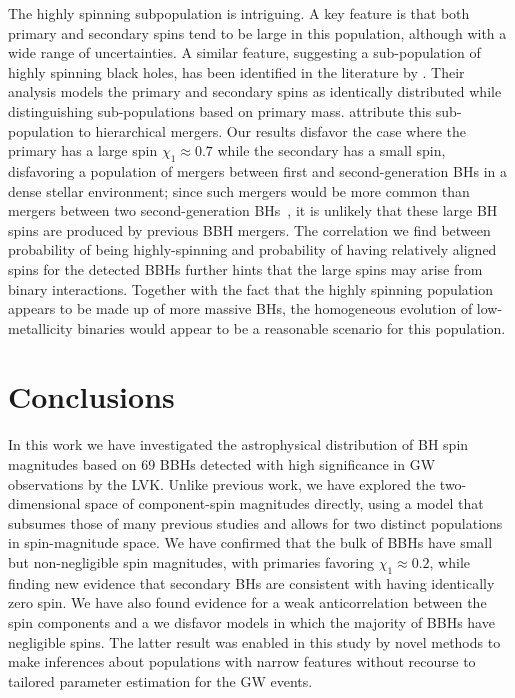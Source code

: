\documentclass[twocolumn,usenames,dvipsnames,linenumbers]{aastex631}
\begin{document}
The highly spinning subpopulation is intriguing. 
A key feature is that both primary and secondary spins tend to be large in this population, although with a wide range of uncertainties.
A similar feature, suggesting a sub-population of highly spinning black holes, has been identified in the literature by \cite{Li:2024-HierarchicalMerger}. Their analysis models the primary and secondary spins as identically distributed while distinguishing sub-populations based on primary mass. \cite{Li:2024-HierarchicalMerger} attribute this sub-population to hierarchical mergers. Our results disfavor the case where the primary has a large spin $\chi_1 \approx 0.7$ while the secondary has a small spin, disfavoring a population of mergers between first and second-generation \acp{BH} in a dense stellar environment; since such mergers would be more common than mergers between two second-generation \acp{BH}~\citep[e.g.,][]{2020ApJ...900..177K}, it is unlikely that these large BH spins are produced by previous \ac{BBH} mergers.
The correlation we find between probability of being highly-spinning and probability of having relatively aligned spins for the detected \acp{BBH} further hints that the large spins may arise from binary interactions.
Together with the fact that the highly spinning population appears to be made up of more massive \acp{BH}, the homogeneous evolution of low-metallicity binaries would appear to be a reasonable scenario for this population.


\section{Conclusions}
\label{sec:Conclusions}

In this work we have investigated the astrophysical distribution of \ac{BH} spin magnitudes based on 69 \acp{BBH} detected with high significance in \ac{GW} observations by the \ac{LVK}.
Unlike previous work, we have explored the two-dimensional space of component-spin magnitudes directly, using a model that subsumes those of many previous studies and allows for two distinct populations in spin-magnitude space.
We have confirmed that the bulk of \acp{BBH} have small but non-negligible spin magnitudes, with primaries favoring $\chi_1 \approx 0.2$, while finding new evidence that secondary \acp{BH} are consistent with having identically zero spin.
We have also found evidence for a weak anticorrelation between the spin components and a we disfavor models in which the majority of \acp{BBH} have negligible spins.
The latter result was enabled in this study by novel methods to make inferences about populations with narrow features
without recourse to tailored parameter estimation for the \ac{GW} events.
\end{document}
